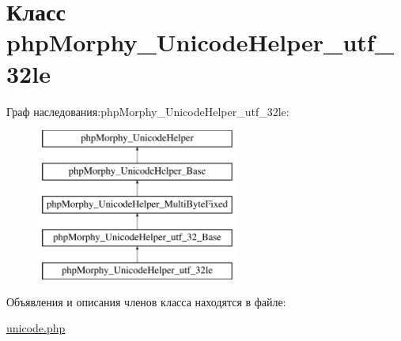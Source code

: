 \hypertarget{classphpMorphy__UnicodeHelper__utf__32le}{
\section{Класс phpMorphy\_\-UnicodeHelper\_\-utf\_\-32le}
\label{classphpMorphy__UnicodeHelper__utf__32le}
}
Граф наследования:phpMorphy\_\-UnicodeHelper\_\-utf\_\-32le:\begin{figure}[H]
\begin{center}
\leavevmode
\includegraphics[height=5.000000cm]{classphpMorphy__UnicodeHelper__utf__32le}
\end{center}
\end{figure}


Объявления и описания членов класса находятся в файле:\begin{DoxyCompactItemize}
\item 
\hyperlink{unicode_8php}{unicode.php}\end{DoxyCompactItemize}
